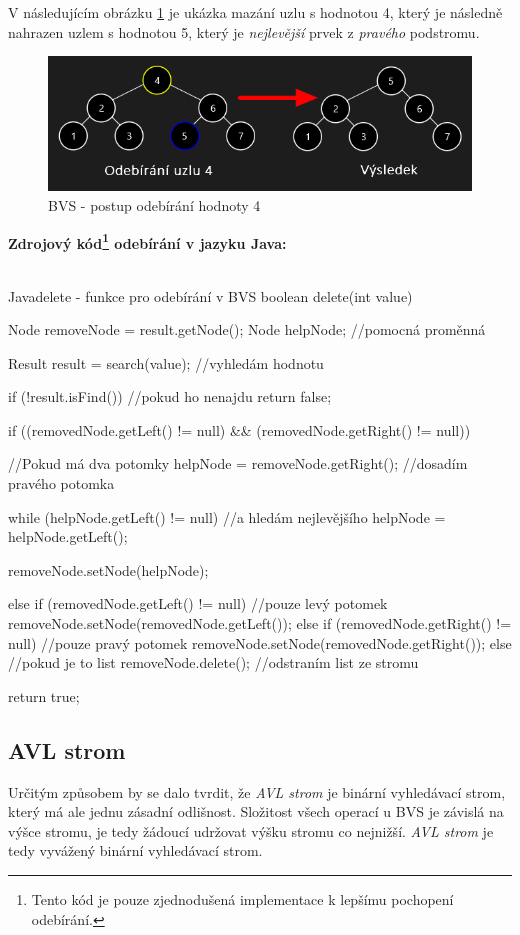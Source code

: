 \documentclass[
  biblatex=false,
  font=serif,
  glossaries=false,
  tables=false,
  theorems=false,
  index
]{kidiplom}
\begin{document}
\medskip
\noindent V následujícím obrázku \ref{binaryDelete} je ukázka mazání uzlu s hodnotou 4, který je následně nahrazen uzlem s hodnotou 5, který je \textit{nejlevější} prvek z \textit{pravého} podstromu.

\begin{figure}[h!]
\centering
	\includegraphics[scale=0.7]{obrazky/7BinarniMazani.png}
	\caption{BVS - postup odebírání hodnoty 4}
	\label{binaryDelete}
\end{figure}

\newpage\noindent \textbf{Zdrojový kód\footnote{Tento kód je pouze zjednodušená implementace k lepšímu pochopení odebírání.} odebírání v jazyku Java:}\\\\

\begin{kicode}{Java}{}{delete - funkce pro odebírání v BVS}
boolean delete(int value) {
	Node removeNode = result.getNode();
	Node helpNode; //pomocná proměnná
	
	Result result = search(value); //vyhledám hodnotu
	
	if (!result.isFind()) {  //pokud ho nenajdu
		return false;
	}	
	
	if ((removedNode.getLeft() != null) && (removedNode.getRight() != null)) { //Pokud má dva potomky 
		helpNode = removeNode.getRight(); //dosadím pravého potomka	
			
		while (helpNode.getLeft() != null) { //a hledám nejlevějšího
			helpNode = helpNode.getLeft();
		}
		
		removeNode.setNode(helpNode);
	} else if (removedNode.getLeft() != null) { //pouze levý potomek
		removeNode.setNode(removedNode.getLeft());
	} else if (removedNode.getRight() != null) { //pouze pravý potomek
		removeNode.setNode(removedNode.getRight());
	} else { //pokud je to list   
		removeNode.delete(); //odstraním list ze stromu
	}        
	
	return true; 
}
\end{kicode} 

\newpage
\subsection{AVL strom}
\indent\indent Určitým způsobem by se dalo tvrdit, že \textit{AVL strom} je binární vyhledávací strom, který má ale jednu zásadní odlišnost. Složitost všech operací u BVS je závislá na výšce stromu, je tedy žádoucí udržovat výšku stromu co nejnižší. \textit{AVL strom} je tedy vyvážený binární vyhledávací strom. \\
\end{document}
